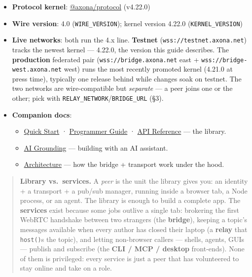 \documentclass[
  nobib]{tufte-handout}
\providecommand{\tightlist}{%
  \setlength{\itemsep}{0pt}\setlength{\parskip}{0pt}}
\begin{document}
\begin{itemize}
\tightlist
\item
  \textbf{Protocol kernel}:
  \href{https://github.com/axona-net/axona-protocol}{@axona/protocol}
  (v4.22.0)
\item
  \textbf{Wire version}: 4.0 (\texttt{WIRE\_VERSION}); kernel version
  4.22.0 (\texttt{KERNEL\_VERSION})
\item
  \textbf{Live networks}: both run the 4.x line. \textbf{Testnet}
  (\texttt{wss://testnet.axona.net}) tracks the newest kernel ---
  4.22.0, the version this guide describes. The \textbf{production}
  federated pair (\texttt{wss://bridge.axona.net} east +
  \texttt{wss://bridge-west.axona.net} west) runs the most recently
  promoted kernel (4.21.0 at press time), typically one release behind
  while changes soak on testnet. The two networks are wire-compatible
  but \emph{separate} --- a peer joins one or the other; pick with
  \texttt{RELAY\_NETWORK}/\texttt{BRIDGE\_URL} (§3).
\item
  \textbf{Companion docs}:

  \begin{itemize}
  \tightlist
  \item
    \href{Quick-Start-v4.22.0.md}{Quick Start} ·
    \href{Axona-Programmer-Guide-v4.22.0.md}{Programmer Guide} ·
    \href{Axona-API-Reference-v4.22.0.md}{API Reference} --- the
    library.
  \item
    \href{Axona-AI-Grounding-v4.22.0.md}{AI Grounding} --- building with
    an AI assistant.
  \item
    \href{../architecture/Axona-Architecture.tex}{Architecture} --- how
    the bridge + transport work under the hood.
  \end{itemize}
\end{itemize}

\begin{quote}
\textbf{Library vs.~services.} A \emph{peer} is the unit the library
gives you: an identity + a transport + a pub/sub manager, running inside
a browser tab, a Node process, or an agent. The library is enough to
build a complete app. The \textbf{services} exist because some jobs
outlive a single tab: brokering the first WebRTC handshake between two
strangers (the \textbf{bridge}), keeping a topic's messages available
when every author has closed their laptop (a \textbf{relay} that
\texttt{host()}s the topic), and letting non-browser callers --- shells,
agents, GUIs --- publish and subscribe (the \textbf{CLI / MCP / desktop}
front-ends). None of them is privileged: every service is just a peer
that has volunteered to stay online and take on a role.
\end{quote}
\end{document}
